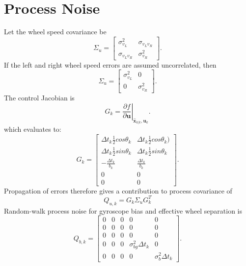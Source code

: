\documentclass[11pt]{article}
\begin{document}
\section{Process Noise}
Let the wheel speed covariance be
\begin{equation}
\Sigma_u =
\begin{bmatrix}
\sigma_{v_L}^2 & \sigma_{v_L v_R} \\
\sigma_{v_L v_R} & \sigma_{v_R}^2
\end{bmatrix}.
\end{equation}
If the left and right wheel speed errors are assumed
uncorrelated, then
\begin{equation}
\Sigma_u =
\begin{bmatrix}
\sigma_{v_L}^2 & 0 \\
0 & \sigma_{v_R}^2
\end{bmatrix}.
\end{equation}
The control Jacobian is
\begin{equation}
G_k
=
\left.
\frac{\partial f}{\partial \mathbf{u}}
\right|_{\hat{\mathbf{x}}_{k|k},\mathbf{u}_k}.
\end{equation}
which evaluates to:
\begin{equation}
G_k
=
\begin{bmatrix}
\Delta t_k\frac{1}{2}cos\theta_k &
\Delta t_k\frac{1}{2}cos\theta_k)
\\
\Delta t_k\frac{1}{2}sin\theta_k  &
\Delta t_k\frac{1}{2}sin\theta_k 
\\
-\frac{\Delta t_k}{b_k} &
\frac{\Delta t_k}{b_k}
\\
0 & 0
\\
0 & 0
\end{bmatrix}.
\end{equation}
Propagation of errors therefore gives a contribution to process covariance of
\begin{equation}
Q_{u,k}
=
G_k
\Sigma_u
G_k^{T}
\end{equation}
Random-walk process noise for gyroscope bias and effective wheel separation is
\begin{equation}
Q_{b,k}
=
\begin{bmatrix}
0 & 0 & 0 & 0 & 0 \\
0 & 0 & 0 & 0 & 0 \\
0 & 0 & 0 & 0 & 0 \\
0 & 0 & 0 & \sigma_{bg}^2 \Delta t_k & 0 \\
0 & 0 & 0 & 0 & \sigma_b^2 \Delta t_k
\end{bmatrix}.
\end{equation}
\end{document}
